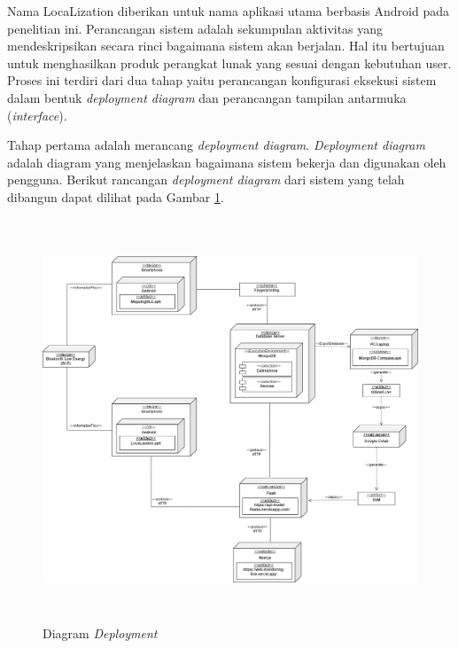 \par Nama LocaLization diberikan untuk nama aplikasi utama berbasis Android pada penelitian ini. Perancangan sistem adalah sekumpulan aktivitas yang mendeskripsikan secara rinci bagaimana sistem akan berjalan. Hal itu bertujuan untuk menghasilkan produk perangkat lunak yang sesuai dengan kebutuhan user. Proses ini terdiri dari dua tahap yaitu perancangan konfigurasi eksekusi sistem dalam bentuk \textit{deployment diagram} dan perancangan tampilan antarmuka (\textit{interface}).

Tahap pertama adalah merancang \textit{deployment diagram}. \textit{Deployment diagram} adalah diagram yang menjelaskan bagaimana sistem bekerja dan digunakan oleh pengguna. Berikut rancangan \textit{deployment diagram} dari sistem yang telah dibangun dapat dilihat pada Gambar \ref{deployment-diagram}.

\vspace{-0.2cm}
\begin{landscape}
	\begin{figure}[H]
		\center
		\includegraphics [width = 22.5cm, height=12cm]{gambar/diagramdeployment.png}
		\caption{Diagram \textit{Deployment}}
		\label{deployment-diagram}
	\end{figure}
\end{landscape}

